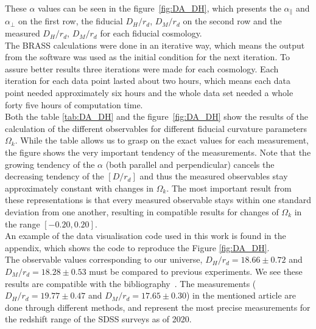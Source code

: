 These $\alpha$ values can be seen in the figure~\ref{fig:DA_DH}, which presents the $\alpha_\parallel$ and $\alpha_\perp$ on the first row, the fiducial $D_H / r_d$, $D_M/r_d $ on the second row and the measured $D_H / r_d$, $D_M /r_d$ for each fiducial cosmology.  \\

The BRASS calculations were done in an iterative way, which means the output from the software was used as the initial condition for the next iteration. To assure better results three iterations were made for each cosmology.  Each iteration for each data point lasted about two hours, which means each data point needed approximately six hours and the whole data set needed a whole forty five hours of computation time.\\

Both the table \ref{tab:DA_DH} and the figure~\ref{fig:DA_DH} show the results of the calculation of the different observables for different fiducial curvature parameters $\Omega_k$. While the table allows us to grasp on the exact values for each measurement, the figure shows the very important tendency of the measurements. Note that the growing tendency of the $\alpha$ (both parallel and perpendicular) cancels the decreasing tendency of the $\left[ D /r_d \right] $ and thus the measured observables stay approximately constant with changes in $\Omega_k$. The most important result from these representations is that every measured observable stays within one standard deviation from one another, resulting in compatible results for changes of $\Omega_k$ in the range $\left[ -0.20, 0.20  \right] $. \\

An example of the data visualisation code used in this work is found in the appendix, which shows the code to reproduce the Figure \ref{fig:DA_DH}.\\

The observable values corresponding to our universe, $D_H/r_d = 18.66 \pm 0.72$ and $D_M/r_d = 18.28 \pm 0.53$ must be compared to previous experiments. We see these results are compatible with the bibliography~\cite{hector}. The measurements ($D_H/r_d = 19.77\pm0.47$ and $D_M/ r_d=17.65\pm 0.30$) in the mentioned article are done through different methods, and represent the most precise measurements for the redshift range of the SDSS surveys as of 2020.


